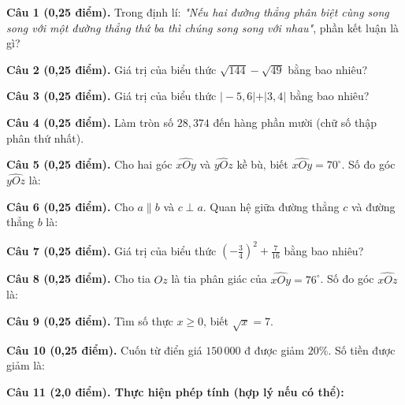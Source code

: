 \documentclass[12pt,a4paper]{article}
\begin{document}
\noindent\textbf{Câu 1 (0,25 điểm).} Trong định lí: \textit{"Nếu hai đường thẳng phân biệt cùng song song với một đường thẳng thứ ba thì chúng song song với nhau"}, phần kết luận là gì? \par\vspace{0.35mm}
\noindent\textbf{Câu 2 (0,25 điểm).} Giá trị của biểu thức $\sqrt{144} - \sqrt{49}$ bằng bao nhiêu? \par\vspace{0.35mm}
\noindent\textbf{Câu 3 (0,25 điểm).} Giá trị của biểu thức $\vert -5{,}6\vert + \vert 3{,}4\vert$ bằng bao nhiêu? \par\vspace{0.35mm}
\noindent\textbf{Câu 4 (0,25 điểm).} Làm tròn số $28{,}374$ đến hàng phần mười (chữ số thập phân thứ nhất). \par\vspace{0.35mm}
\noindent\textbf{Câu 5 (0,25 điểm).} Cho hai góc $\widehat{xOy}$ và $\widehat{yOz}$ kề bù, biết $\widehat{xOy} = 70^\circ$. Số đo góc $\widehat{yOz}$ là: \par\vspace{0.35mm}
\noindent\textbf{Câu 6 (0,25 điểm).} Cho $a \parallel b$ và $c \perp a$. Quan hệ giữa đường thẳng $c$ và đường thẳng $b$ là: \par\vspace{0.35mm}
\noindent\textbf{Câu 7 (0,25 điểm).} Giá trị của biểu thức $\left(-\frac{3}{4}\right)^2 + \frac{7}{16}$ bằng bao nhiêu? \par\vspace{0.35mm}
\noindent\textbf{Câu 8 (0,25 điểm).} Cho tia $Oz$ là tia phân giác của $\widehat{xOy} = 76^\circ$. Số đo góc $\widehat{xOz}$ là: \par\vspace{0.35mm}
\noindent\textbf{Câu 9 (0,25 điểm).} Tìm số thực $x \ge 0$, biết $\sqrt{x} = 7$. \par\vspace{0.35mm}
\noindent\textbf{Câu 10 (0,25 điểm).} Cuốn từ điển giá $150\,000$ đ được giảm $20\%$. Số tiền được giảm là: \par\vspace{0.35mm}
\vspace{0.6mm}

\noindent\textbf{Câu 11 (2,0 điểm). Thực hiện phép tính (hợp lý nếu có thể):}
\vspace{0.6mm}
\end{document}
